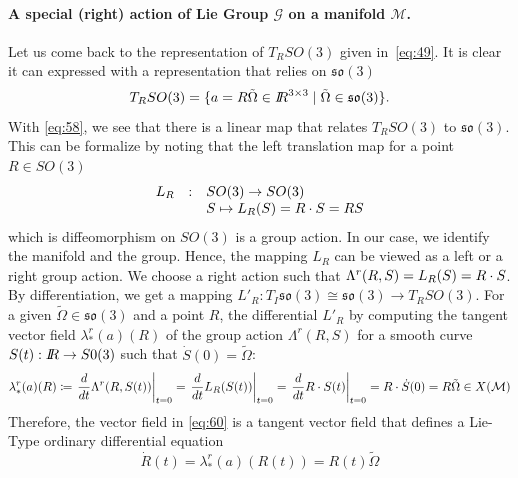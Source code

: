 \paragraph{ A special  (right)  action of Lie Group $\mathcal G$ on a manifold $\mathcal M$. }

Let us come back to the representation of  $T_RSO(3)$ given in~\eqref{eq:49}. It is clear it can expressed with a representation that relies on $\mathfrak{so}(3)$
\begin{equation}
  \label{eq:58}
   T_RSO(3) = \{ a = R \tilde \Omega \in \mbox{\rm $I\!\!R$}^{3\times 3} \mid \tilde \Omega \in \mathfrak{so}(3) \}.
\end{equation}
With \eqref{eq:58}, we see that there is a linear map that relates $T_RSO(3)$ to  $\mathfrak{so}(3)$. This can be formalize by noting that the left translation map for a point $R \in SO(3)$
\begin{equation}
  \label{eq:59}
  \begin{array}[lcl]{rcl}
    L_R& :&   SO(3)  \rightarrow  SO(3)\\
       & &  S  \mapsto L_R(S) = R \glaw S = RS\\
  \end{array}
\end{equation}
which is diffeomorphism on $SO(3)$ is a group action. In our case, we identify the manifold and the group. Hence, the mapping $L_R$ can be viewed as a left or a right group action. We choose a right action such that $\Lambda^r(R,S) = L_{R}(S) =  R \cdot S $. By differentiation, we get a mapping $L'_R: T_I\mathfrak{so(3)} \cong \mathfrak{so(3)} \rightarrow T_R SO(3)$. For a given $\tilde\Omega \in \mathfrak{so(3)}$ and a point $R$, the differential $L'_R$ by computing the tangent vector field $\lambda^r_{*}(a)(R)$ of the group action  $\Lambda^r(R,S)$ for a smooth curve $S(t) : \mbox{\rm $I\!\!R$} \rightarrow S0(3)$ such that $\dot S(0) = \tilde\Omega$:
\begin{equation}
  \label{eq:60}
   \lambda^r_{*}(a)(R) \coloneqq  \left. \frac{d}{dt} \Lambda^r(R,S(t)) \right|_{t=0} = \left. \frac{d}{dt} L_{R}(S(t)) \right|_{t=0} =  \left. \frac{d}{dt} R \cdot S(t) \right|_{t=0} =  R \cdot \dot S(0) = R \tilde\Omega \in X(\mathcal M)
 \end{equation}
%
Therefore, the vector field in \eqref{eq:60} is a tangent vector field that defines a Lie-Type ordinary differential equation
\begin{equation}
  \label{eq:61}
  \dot R(t) = \lambda^r_{*}(a)(R(t)) = R(t)  \tilde \Omega
\end{equation}



